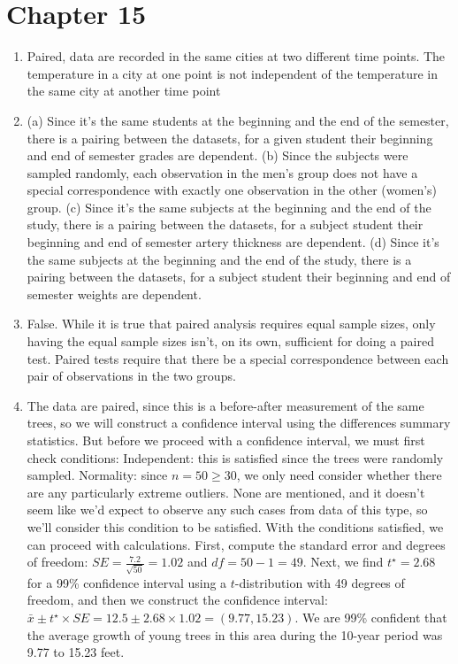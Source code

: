 \documentclass[
  10pt,
  openany]{book}
\providecommand{\tightlist}{%
  \setlength{\itemsep}{0pt}\setlength{\parskip}{0pt}}
\begin{document}
\hypertarget{exercise-solutions-21}{%
\section{Chapter 15}\label{exercise-solutions-21}}

\begin{enumerate}
\def\labelenumi{\arabic{enumi}.}
\tightlist
\item
  Paired, data are recorded in the same cities at two different time points. The temperature in a city at one point is not independent of the temperature in the same city at another time point

  \addtocounter{enumi}{1}
\item
  (a) Since it's the same students at the beginning and the end of the semester, there is a pairing between the datasets, for a given student their beginning and end of semester grades are dependent. (b) Since the subjects were sampled randomly, each observation in the men's group does not have a special correspondence with exactly one observation in the other (women's) group. (c) Since it's the same subjects at the beginning and the end of the study, there is a pairing between the datasets, for a subject student their beginning and end of semester artery thickness are dependent. (d) Since it's the same subjects at the beginning and the end of the study, there is a pairing between the datasets, for a subject student their beginning and end of semester weights are dependent.

  \addtocounter{enumi}{1}
\item
  False. While it is true that paired analysis requires equal sample sizes, only having the equal sample sizes isn't, on its own, sufficient for doing a paired test. Paired tests require that there be a special correspondence between each pair of observations in the two groups.

  \addtocounter{enumi}{1}
\item
  The data are paired, since this is a before-after measurement of the same trees, so we will construct a confidence interval using the differences summary statistics. But before we proceed with a confidence interval, we must first check conditions: Independent: this is satisfied since the trees were randomly sampled. Normality: since \(n = 50 \geq 30\), we only need consider whether there are any particularly extreme outliers. None are mentioned, and it doesn't seem like we'd expect to observe any such cases from data of this type, so we'll consider this condition to be satisfied. With the conditions satisfied, we can proceed with calculations. First, compute the standard error and degrees of freedom: \(SE = \frac{7.2}{\sqrt{50}} = 1.02\) and \(df = 50 - 1 = 49\). Next, we find \(t^{\star} = 2.68\) for a 99\% confidence interval using a \(t\)-distribution with 49 degrees of freedom, and then we construct the confidence interval: \(\bar{x} \pm t^{\star} \times SE = 12.5 \pm 2.68 \times 1.02 = (9.77, 15.23)\). We are 99\% confident that the average growth of young trees in this area during the 10-year period was 9.77 to 15.23 feet.


\end{enumerate}
\end{document}
